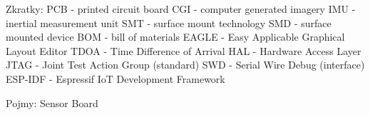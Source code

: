Zkratky:
PCB - printed circuit board
CGI - computer generated imagery
IMU - inertial measurement unit
SMT - surface mount technology
SMD - surface mounted device
BOM - bill of materials
EAGLE - Easy Applicable Graphical Layout Editor
TDOA - Time Difference of Arrival
HAL - Hardware Access Layer
JTAG - Joint Test Action Group (standard)
SWD - Serial Wire Debug (interface)
ESP-IDF - Espressif IoT Development Framework

Pojmy:
Sensor Board